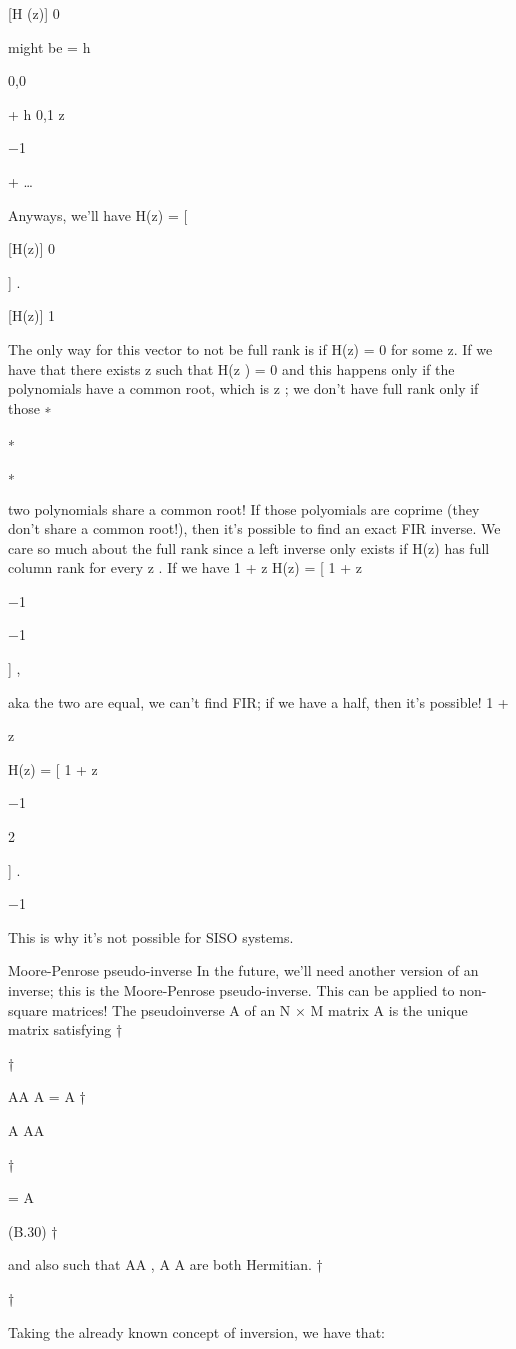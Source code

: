{[H (z)] 0

might be = h

0,0

+ h 0,1 z

−1

+ …

Anyways, we'll have H(z) = [

[H(z)] 0

] .

[H(z)] 1

The only way for this vector to not be full rank is if H(z) = 0 for some z.
If we have that there exists z such that H(z ) = 0 and this happens only if the polynomials have a common root, which is z ; we don't have full rank only if those
∗

∗

∗

two polynomials share a common root!
If those polyomials are coprime (they don't share a common root!), then it's possible to find an exact FIR inverse.
We care so much about the full rank since a left inverse only exists if H(z) has full column rank for every z .
If we have 1 + z H(z) = [
1 + z

−1

−1

] ,

aka the two are equal, we can't find FIR; if we have a half, then it's possible!
1 +

z

H(z) = [
1 + z

−1

2

] .

−1

This is why it's not possible for SISO systems.

Moore-Penrose pseudo-inverse In the future, we'll need another version of an inverse; this is the Moore-Penrose pseudo-inverse.
This can be applied to non-square matrices!
The pseudoinverse A of an N × M matrix A is the unique matrix satisfying
†

†

AA A = A
†

A AA

†

= A

(B.30)
†

and also such that AA , A A are both Hermitian.
†

†

Taking the already known concept of inversion, we have that:

}
